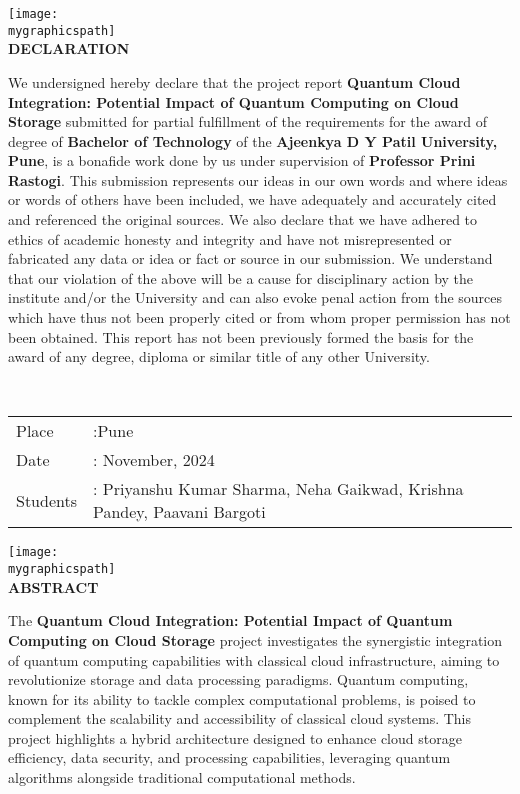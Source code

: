 \documentclass[12pt,a4paper]{article}
\newcommand{\mygraphicspath}{D:/SEM-5/FSDC/quantum-cloud-integration/images/ADYPU_LOGO.png}
\newcommand{\vname}{Priyanshu Kumar Sharma, Neha Gaikwad, Krishna Pandey, Paavani Bargoti}
\newcommand{\vdate}{November, 2024}
\newcommand{\vtitle}{Quantum Cloud Integration: Potential Impact of Quantum Computing on Cloud Storage}
\newcommand{\vguide}{Professor Prini Rastogi}
\begin{document}
\begin{center}
    \texttt{[image: \\mygraphicspath]}\\[2cm]
    \fontsize{14}{16}\selectfont \bfseries
    DECLARATION
    \end{center}
    We undersigned hereby declare that the project report 
    {\bfseries \vtitle} submitted for
    partial fulfillment of the requirements for the award of degree of \textbf{Bachelor of Technology} of
    the \textbf{Ajeenkya D Y Patil University, Pune}, is a bonafide work done by us
    under supervision of \textbf{\vguide}. This submission represents our ideas in
    our own words and where ideas or words of others have been included, we have adequately
    and accurately cited and referenced the original sources. We also declare that we have
    adhered to ethics of academic honesty and integrity and have not misrepresented or
    fabricated any data or idea or fact or source in our submission. We understand that our
    violation of the above will be a cause for disciplinary action by the institute and/or the
    University and can also evoke penal action from the sources which have thus not been
    properly cited or from whom proper permission has not been obtained. This report has
    not been previously formed the basis for the award of any degree, diploma or similar title
    of any other University. 
    
    \qquad\\[1cm]
    \begin{tabular}{llll}
    Place&:\enspace Pune\qquad  \\
    Date&: \vdate \\
    Students&: \vname
    \end{tabular}

\newpage



\begin{center}
    \texttt{[image: \\mygraphicspath]}\\[2cm]
    \fontsize{14}{16}\selectfont \bfseries
    ABSTRACT
    \end{center}

The \textbf{Quantum Cloud Integration: Potential Impact of Quantum Computing on Cloud Storage} project investigates the synergistic integration of quantum computing capabilities with classical cloud infrastructure, aiming to revolutionize storage and data processing paradigms. Quantum computing, known for its ability to tackle complex computational problems, is poised to complement the scalability and accessibility of classical cloud systems. This project highlights a hybrid architecture designed to enhance cloud storage efficiency, data security, and processing capabilities, leveraging quantum algorithms alongside traditional computational methods.  
\end{document}
